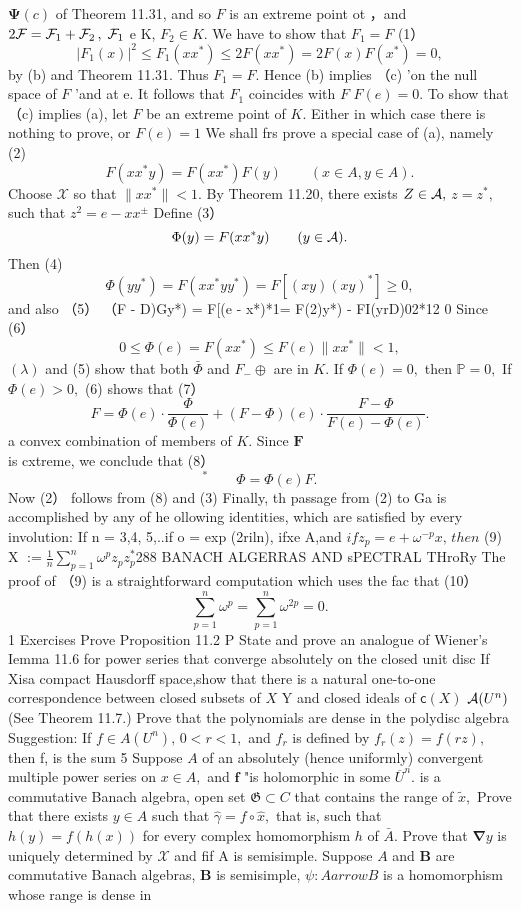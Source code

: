 $\mathbf{\Psi}(c)$ of Theorem 11.31, and so ${\mathbf{}}F$ is an extreme point ot ，and $2{\cal F}={\cal F}_{1}+{\cal F}_{2}\,,\;{\cal F}_{1}$ e K, $F_{2}\in K.$ We have to show that $F_{1}=F$ (1） $$ \left|F_{1}(x)\right|^{2}\leq F_{1}(x x^{*})\leq2F(x x^{*})=2F(x)F(x^{*})=0, $$ by (b) and Theorem 11.31. Thus $F_{1}=F.$ Hence (b) implies （c) 'on the null space of ${\mathbf{}}F$ 'and at e. It follows that $F_{1}$ coincides with ${\mathbf{}}F$ $F(e)=0.$ To show that （c) implies (a), let ${\mathbf{}}F$ be an extreme point of $K.$ Either in which case there is nothing to prove, or $F(e)=1$ We shall frs prove a special case of (a), namely (2) $$ F(x x^{*}y)=F(x x^{*})F(y)\qquad(x\in A,y\in A). $$ Choose $\textstyle{\mathcal{X}}$ so that $\|x x^{*}\|<1.$ By Theorem 11.20, there exists $Z\in{\cal{A}},$ $z=z^{*},$ such that $z^{2}=e-x x^{\pm}$ Define (3） $$ \Phi(y)=F(x x^{*}y)\qquad(y\in{\cal A}). $$ Then (4) $$ \Phi(y y^{*})=F(x x^{*}y y^{*})=F[(x y)(x y)^{*}]\geq0, $$ and also （5） （F - D)Gy*) = F[(e - x*)*1= F(2)y*) - FI(yrD)02*12 0 Since (6） $$ 0\leq\Phi(e)=F(x x^{*})\leq F(e)\|x x^{*}\|<1, $$ $(\lambda)$ and (5) show that both $\bar{\Phi}$ and $F_{-}\oplus$ are in $K.$ If $\Phi(e)=0,$ then $\scriptstyle{\mathbb{P}}=0,$ If $\Phi(e)>0,$ (6) shows that (7） $$ F=\Phi(e)\cdot{\frac{\Phi}{\Phi(e)}}+(F-\Phi)(e)\cdot{\frac{F-\Phi}{F(e)-\Phi(e)}}. $$ a convex combination of members of $K.$ Since ${\boldsymbol{F}}$ is cxtreme, we conclude that (8） $$ {}^{*}\qquad\Phi=\Phi(e)F. $$ Now (2） follows from (8) and (3) Finally, th passage from (2) to Ga is accomplished by any of he ollowing identities, which are satisfied by every involution: If n = 3,4, 5,..if o = exp (2riln), ifxe A,and $i f z_{p}=e+\omega^{-p}x,\,t h e n$ (9) X $:={\frac{1}{n}}\sum_{p=1}^{n}\omega^{p}z_{p}z_{p}^{*}$288 BANACH ALGERRAS AND sPECTRAL THroRy The proof of （9) is a straightforward computation which uses the fac that (10） $$ \sum_{p=1}^{n}\omega^{p}=\sum_{p=1}^{n}\omega^{2p}=0. $$ 1 Exercises Prove Proposition 11.2 P State and prove an analogue of Wiener's Iemma 11.6 for power series that converge absolutely on the closed unit disc If Xisa compact Hausdorff space,show that there is a natural one-to-one correspondence between closed subsets of $\textstyle X$ Y and closed ideals of ${\mathsf{c}}(X)$ ${\cal A}(U^{n})$ (See Theorem 11.7.) Prove that the polynomials are dense in the polydisc algebra Suggestion: If $f\in A(U^{n}),\,0<r<1,$ and $f_{r}$ is defined by $f_{r}(z)=f(r z),$ then f, is the sum 5 Suppose $\textstyle A$ of an absolutely (hence uniformly) convergent multiple power series on $x\in A,$ and $\boldsymbol{f}$ "is holomorphic in some ${\overline{{U}}}^{n}.$ is a commutative Banach algebra, open set ${\mathfrak{G}}{\subset}{\mathit{C}}$ that contains the range of ${\tilde{x}},$ Prove that there exists $y\in A$ such that ${\hat{\gamma}}=f\circ{\hat{x}},$ that is, such that $h(y)=f(h(x))$ for every complex homomorphism $\boldsymbol{\mathit{h}}$ of ${\bar{A}}.$ Prove that $\mathbf{\nabla}y$ is uniquely determined by $\scriptstyle{\mathcal{X}}$ and fif A is semisimple. Suppose $\textstyle A$ and $\boldsymbol{B}$ are commutative Banach algebras, $\boldsymbol{B}$ is semisimple, $\textstyle\psi:A arrow B$ is a homomorphism whose range is dense in 